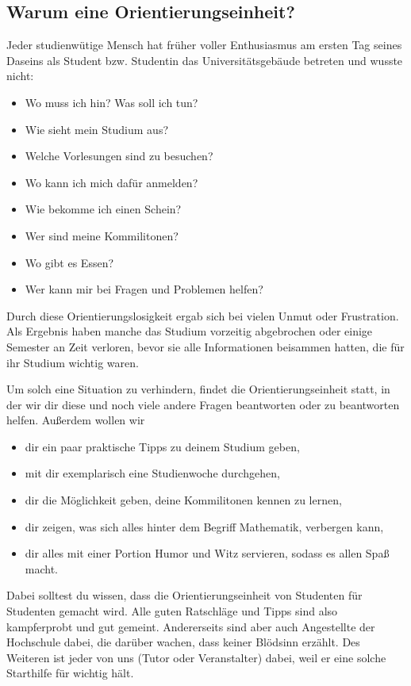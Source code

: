 \subsection{Warum eine Orientierungseinheit?}

Jeder studienwütige Mensch hat früher voller Enthusiasmus am ersten Tag seines
Daseins als Student bzw. Studentin das Universitätsgebäude betreten und wusste
nicht: 

\begin{itemize}\itemsep 0pt
    \item Wo muss ich hin? Was soll ich tun? 
    \item Wie sieht mein Studium aus?
    \item Welche Vorlesungen sind zu besuchen?
    \item Wo kann ich mich dafür anmelden?
    \item Wie bekomme ich einen Schein?
    \item Wer sind meine Kommilitonen?
    \item Wo gibt es Essen?
    \item Wer kann mir bei Fragen und Problemen helfen?
\end{itemize}

Durch diese Orientierungslosigkeit ergab sich bei vielen Unmut oder
Frustration. Als Ergebnis haben manche das Studium vorzeitig abgebrochen oder
einige Semester an Zeit verloren, bevor sie alle Informationen beisammen
hatten, die für ihr Studium wichtig waren.

Um solch eine Situation zu verhindern, findet die Orientierungseinheit statt,
in der wir dir diese und noch viele andere Fragen beantworten oder zu
beantworten helfen.  Außerdem wollen wir 

\begin{itemize}\itemsep 0pt
    \item dir ein paar praktische Tipps zu deinem Studium geben,
    \item mit dir exemplarisch eine Studienwoche durchgehen,
    \item dir die Möglichkeit geben, deine Kommi\-litonen kennen zu lernen, 
    \item dir zeigen, was sich alles hinter dem Begriff \glqq Mathematik\grqq,
          verbergen kann,
    \item dir alles mit einer Portion Humor und Witz servieren, sodass es allen
          Spaß macht.
\end{itemize}

Dabei solltest du wissen, dass die Orientierungseinheit von Studenten für
Studenten gemacht wird.  Alle guten Ratschläge und Tipps sind also kampferprobt
und gut gemeint.  Andererseits sind aber auch Angestellte der Hochschule dabei,
die darüber wachen, dass keiner Blödsinn erzählt. Des Weiteren ist jeder von
uns (Tutor oder Veranstalter) dabei, weil er eine solche Starthilfe für wichtig
hält.

